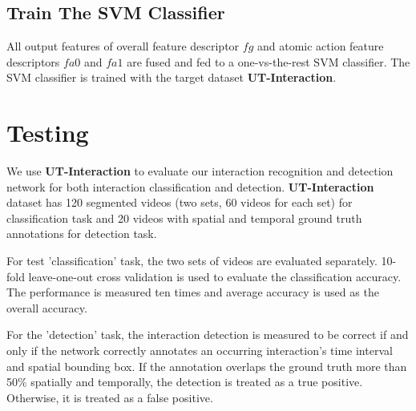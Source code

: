 \subsection{Train The SVM Classifier}
All output features of overall feature descriptor \(fg\) and atomic action feature descriptors \(fa0\) and \(fa1\) are fused and fed to a one-vs-the-rest SVM classifier. The SVM classifier is trained with the target dataset \textbf{UT-Interaction}.

\section{Testing}
\label{3_5}
We use \textbf{UT-Interaction}\cite{ut2010} to evaluate our interaction recognition and detection network for both interaction classification and detection. \textbf{UT-Interaction} dataset has 120 segmented videos (two sets, 60 videos for each set) for classification task and 20 videos with spatial and temporal ground truth annotations for detection task.      
\par 
For test 'classification' task, the two sets of videos are evaluated separately. 10-fold leave-one-out cross validation is used to evaluate the classification accuracy. The performance is measured ten times and average accuracy is used as the overall accuracy. 
\par 
For the 'detection' task, the interaction detection is measured to be correct if and only if the network correctly annotates an occurring interaction's time interval and spatial bounding box. If the annotation overlaps the ground truth more than 50\% spatially and temporally, the detection is treated as a true positive. Otherwise, it is treated as a false positive.  

